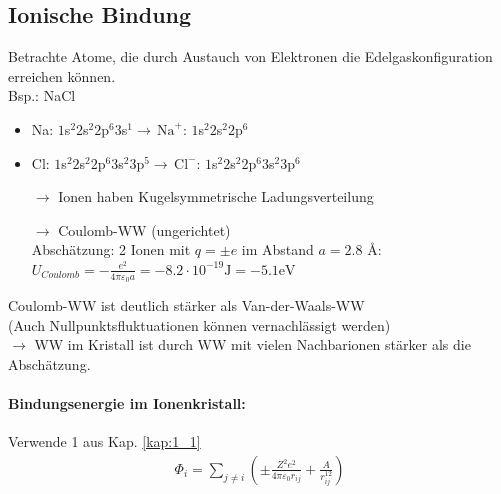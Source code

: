 \subsection{Ionische Bindung} \label{kap:1_3}
	Betrachte Atome, die durch Austauch von Elektronen die Edelgaskonfiguration erreichen können.\\
	Bsp.: NaCl
	\begin{itemize}
		\item Na: $1$s$^2 2$s$^2 2$p$^6 3$s$^1 \rightarrow \, \text{Na}^+: \, 1$s$^2 2$s$^2 2$p$^6$
		\item Cl: $1$s$^2 2$s$^2 2$p$^6 3$s$^2 3$p$^5 \rightarrow \, \text{Cl}^-: \, 1$s$^2 2$s$^2 2$p$^6 3$s$^2 3$p$^6$
	\end{itemize}
	\begin{itemize}
		\item[$\rightarrow$] Ionen haben Kugelsymmetrische Ladungsverteilung
		\item[$\rightarrow$] Coulomb-WW (ungerichtet)\\
			Abschätzung: 2 Ionen mit $q = \pm e$ im Abstand $a = 2.8$ \AA:\\ $U_{Coulomb} = -\frac{e^2}{4 \pi \varepsilon_0 a} = - 8.2 \cdot 10^{-19} \text{J} = -5.1 \text{eV}$
	\end{itemize}

	Coulomb-WW ist deutlich stärker als Van-der-Waals-WW \\
	(Auch Nullpunktsfluktuationen können vernachlässigt werden)\\
	$\rightarrow$ WW im Kristall ist durch WW mit vielen Nachbarionen stärker als die Abschätzung.

\paragraph{Bindungsenergie im Ionenkristall:}
	Verwende 1 aus Kap. \ref{kap:1_1}
	\begin{align*}
		\Phi_i  = \sum_{j \neq i} \left(\pm \frac{Z^2 e^2}{4 \pi \varepsilon_0 r_{ij}} + \frac{A}{r_{ij}^{12}}\right)
	\end{align*}

